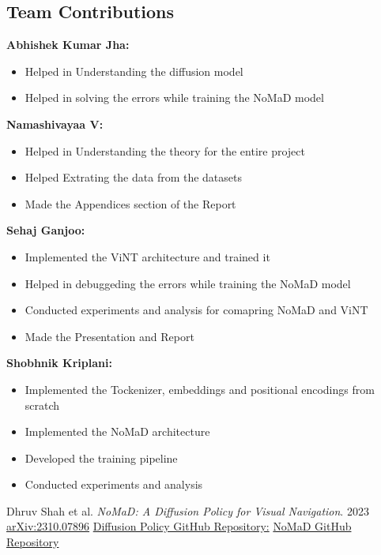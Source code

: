 \documentclass[12pt]{article}
\begin{document}
\begin{appendices}
\section{Team Contributions}
\label{app:team_contributions}
\textbf{Abhishek Kumar Jha:} \\
    \begin{itemize}
        \item Helped in Understanding the diffusion model
        \item Helped in solving the errors while training the NoMaD model
    \end{itemize}
    \textbf{Namashivayaa V:} \\
    \begin{itemize}
        \item Helped in Understanding the theory for the entire project
        \item Helped Extrating the data from the datasets
        \item Made the Appendices section of the Report
    \end{itemize}
    \textbf{Sehaj Ganjoo:} \\
    \begin{itemize}
        \item Implemented the ViNT architecture and trained it
        \item Helped in debuggeding the errors while training the NoMaD model
        \item Conducted experiments and analysis for comapring NoMaD and ViNT
        \item Made the Presentation and Report
    \end{itemize}
    \textbf{Shobhnik Kriplani:} \\
    \begin{itemize}
        \item Implemented the Tockenizer, embeddings and positional encodings from scratch
        \item Implemented the NoMaD architecture
        \item Developed the training pipeline
        \item Conducted experiments and analysis
    \end{itemize}
\newpage
\begin{thebibliography}{9}
\label{references}
Dhruv Shah et al.
\textit{NoMaD: A Diffusion Policy for Visual Navigation}.
2023
\href{https://arxiv.org/abs/2310.07896}{arXiv:2310.07896}
\href{https://github.com/wayveai/diffusion-policy}{Diffusion Policy GitHub Repository:}
\href{https://github.com/robodhruv/visualnav-transformer}{NoMaD GitHub Repository}


\end{thebibliography}
\end{appendices}
\end{document}
